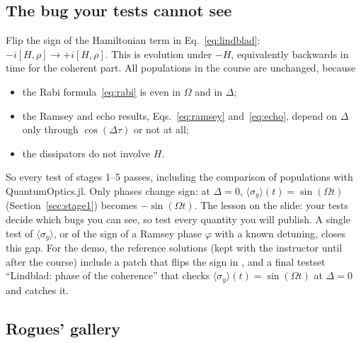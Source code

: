 \subsection{The bug your tests cannot see}

Flip the sign of the Hamiltonian term in Eq.~\eqref{eq:lindblad}: $-i[H, \rho] \to
+i[H, \rho]$. This is evolution under $-H$, equivalently backwards in time for the
coherent part. All populations in the course are unchanged, because
\begin{itemize}
  \item the Rabi formula~\eqref{eq:rabi} is even in $\Omega$ and in $\Delta$;
  \item the Ramsey and echo results, Eqs.~\eqref{eq:ramsey} and~\eqref{eq:echo}, depend
        on $\Delta$ only through $\cos(\Delta\tau)$ or not at all;
  \item the dissipators do not involve $H$.
\end{itemize}
So every test of stages 1--5 passes, including the comparison of populations with
QuantumOptics.jl. Only phases change sign: at $\Delta = 0$,
$\langle\sigma_y\rangle(t) = \sin(\Omega t)$ (Section~\ref{sec:stage1}) becomes
$-\sin(\Omega t)$. The lesson on the slide: your tests decide which bugs you can see, so
test every quantity you will publish. A single test of $\langle\sigma_y\rangle$, or of
the sign of a Ramsey phase $\varphi$ with a known detuning, closes this gap. For the
demo, the reference solutions (kept with the instructor until after the course) include a
patch  that flips the sign in , and a final
testset ``Lindblad: phase of the coherence'' that checks
$\langle\sigma_y\rangle(t) = \sin(\Omega t)$ at $\Delta = 0$ and catches it.

\subsection{Rogues' gallery}

